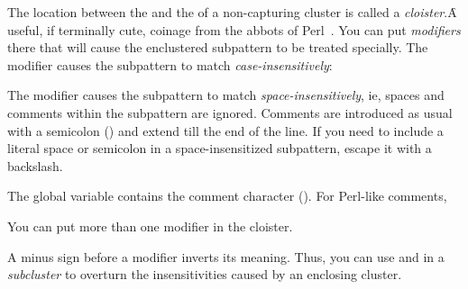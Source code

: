 {The location between the  and the \p{:} of a
non-capturing cluster is called a {\em cloister}.\f{A
useful, if terminally cute, coinage from the abbots of
Perl~\cite{pperl}.}  You can put {\em modifiers}
there that will cause the enclustered subpattern to be
treated specially.  The modifier  causes the
subpattern to match {\em case-insensitively}:


The modifier  causes the subpattern to match
{\em space-insensitively}, ie, spaces and
comments within the
subpattern are ignored.  Comments are introduced
as usual with a semicolon (\p{;}) and extend till
the end of the line.  If you need
to include a literal space or semicolon in
a space-insensitized subpattern, escape it
with a backslash.


\n The global variable 
contains the comment character (\q{#\;}).
For Perl-like comments,


You can put more than one modifier in the cloister.


A minus sign before a modifier inverts its meaning.
Thus, you can use  and  in a {\em
subcluster} to overturn the insensitivities caused by an
enclosing cluster.

}
